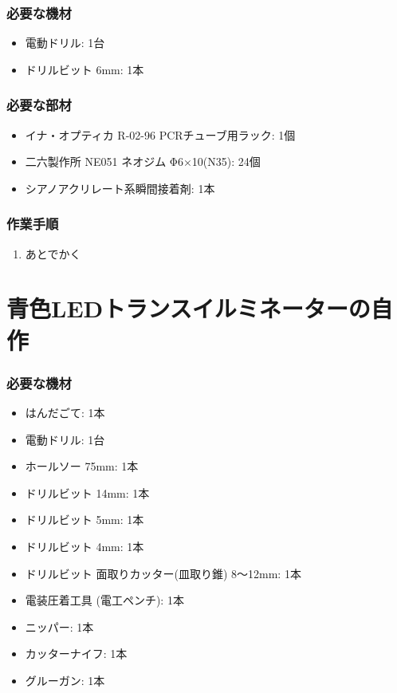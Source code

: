 \documentclass[titlepage,10pt,a4paper,uplatex]{jsbook}
\begin{document}
\subsubsection{必要な機材}
\begin{itemize}
\item 電動ドリル: 1台
\item ドリルビット 6mm: 1本
\end{itemize}

\subsubsection{必要な部材}
\begin{itemize}
\item イナ・オプティカ R-02-96 PCRチューブ用ラック: 1個
\item 二六製作所 NE051 ネオジム Φ6×10(N35): 24個
\item シアノアクリレート系瞬間接着剤: 1本
\end{itemize}

\subsubsection{作業手順}
\begin{enumerate}
\item あとでかく
\end{enumerate}

\section{青色LEDトランスイルミネーターの自作}\label{makingledtransilluminator}

\subsubsection{必要な機材}
\begin{itemize}
\item はんだごて: 1本
\item 電動ドリル: 1台
\item ホールソー 75mm: 1本
\item ドリルビット 14mm: 1本
\item ドリルビット 5mm: 1本
\item ドリルビット 4mm: 1本
\item ドリルビット 面取りカッター(皿取り錐) 8～12mm: 1本
\item 電装圧着工具 (電工ペンチ): 1本
\item ニッパー: 1本
\item カッターナイフ: 1本
\item グルーガン: 1本
\end{itemize}
\end{document}
